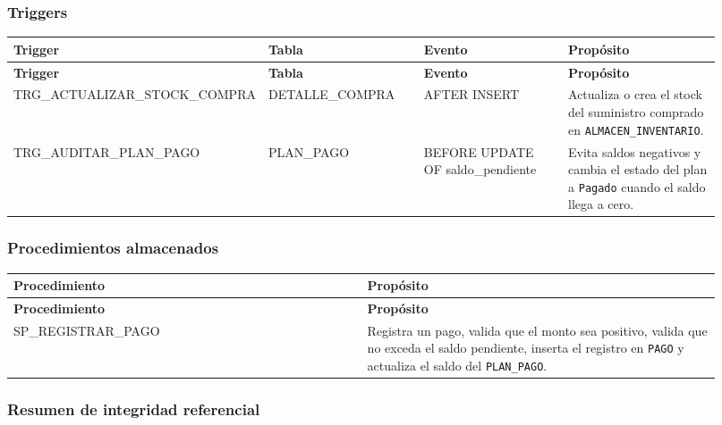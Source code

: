 \subsubsection{Triggers}

\begin{longtable}{p{0.23\linewidth}p{0.23\linewidth}p{0.23\linewidth}p{0.23\linewidth}}
\toprule
\textbf{Trigger} & \textbf{Tabla} & \textbf{Evento} & \textbf{Propósito} \\
\midrule
\endfirsthead
\toprule
\textbf{Trigger} & \textbf{Tabla} & \textbf{Evento} & \textbf{Propósito} \\
\midrule
\endhead
TRG\_ACTUALIZAR\_STOCK\_COMPRA & DETALLE\_COMPRA & AFTER INSERT & Actualiza o crea el stock del suministro comprado en \texttt{ALMACEN\_INVENTARIO}. \\
TRG\_AUDITAR\_PLAN\_PAGO & PLAN\_PAGO & BEFORE UPDATE OF saldo\_pendiente & Evita saldos negativos y cambia el estado del plan a \texttt{Pagado} cuando el saldo llega a cero. \\
\bottomrule
\end{longtable}



\subsubsection{Procedimientos almacenados}

\begin{longtable}{p{0.46\linewidth}p{0.46\linewidth}}
\toprule
\textbf{Procedimiento} & \textbf{Propósito} \\
\midrule
\endfirsthead
\toprule
\textbf{Procedimiento} & \textbf{Propósito} \\
\midrule
\endhead
SP\_REGISTRAR\_PAGO & Registra un pago, valida que el monto sea positivo, valida que no exceda el saldo pendiente, inserta el registro en \texttt{PAGO} y actualiza el saldo del \texttt{PLAN\_PAGO}. \\
\bottomrule
\end{longtable}



\subsubsection{Resumen de integridad referencial}

